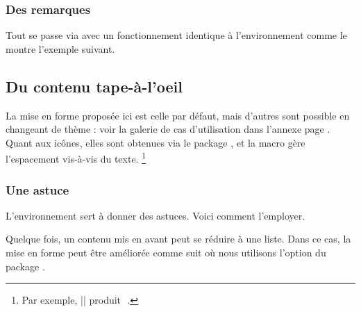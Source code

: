 \subsubsection{Des remarques}

Tout se passe via  avec un fonctionnement identique à l'environnement  comme le montre l'exemple suivant.





\subsection{Du contenu tape-à-l'oeil}
\label{tutodoc-admonitions}

\begin{tdocnote}
    La mise en forme proposée ici est celle par défaut, mais d'autres sont possible en changeant de thème : voir la galerie de cas d'utilisation dans l'annexe page \pageref{tutodoc-theme-gallery}.
    Quant aux icônes, elles sont obtenues via le package , et la macro  gère l'espacement vis-à-vis du texte.
    \footnote{
        Par exemple,
        \tdocinlatex||
        produit\,
        \,.
    }
\end{tdocnote}



\subsubsection{Une astuce}

L'environnement  sert à donner des astuces. Voici comment l'employer.




\smallskip


\begin{tdoctip}
    Quelque fois, un contenu mis en avant peut se réduire à une liste. Dans ce cas, la mise en forme peut être améliorée comme suit où nous utilisons l'option  du package .


\end{tdoctip}


